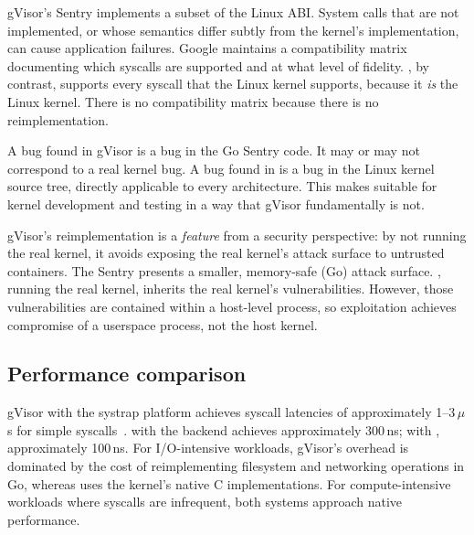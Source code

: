 \begin{description}[style=nextline,leftmargin=2em]
  \item[Compatibility.]
    gVisor's Sentry implements a subset of the Linux ABI.  System
    calls that are not implemented, or whose semantics differ subtly
    from the kernel's implementation, can cause application failures.
    Google maintains a compatibility matrix documenting which syscalls
    are supported and at what level of fidelity.  \UML{}, by contrast,
    supports every syscall that the Linux kernel supports, because it
    \emph{is} the Linux kernel.  There is no compatibility matrix
    because there is no reimplementation.

  \item[Bug fidelity.]
    A bug found in gVisor is a bug in the Go Sentry code.  It may or
    may not correspond to a real kernel bug.  A bug found in \UML{}
    is a bug in the Linux kernel source tree, directly applicable to
    every architecture.  This makes \UML{} suitable for kernel
    development and testing in a way that gVisor fundamentally is not.

  \item[Security posture.]
    gVisor's reimplementation is a \emph{feature} from a security
    perspective: by not running the real kernel, it avoids exposing
    the real kernel's attack surface to untrusted containers.  The
    Sentry presents a smaller, memory-safe (Go) attack surface.
    \UML{}, running the real kernel, inherits the real kernel's
    vulnerabilities.  However, those vulnerabilities are contained
    within a host-level process, so exploitation achieves
    compromise of a userspace process, not the host kernel.
\end{description}

\subsection{Performance comparison}

gVisor with the systrap platform achieves syscall latencies of
approximately 1--3\,$\mu$s for simple syscalls~\cite{gvisor-systrap}.
\UML{} with the \Seccomp{} backend achieves approximately 300\,ns;
with \KVMvTwo{}, approximately 100\,ns.  For I/O-intensive workloads,
gVisor's overhead is dominated by the cost of reimplementing filesystem
and networking operations in Go, whereas \UML{} uses the kernel's
native C implementations.  For compute-intensive workloads where
syscalls are infrequent, both systems approach native performance.

